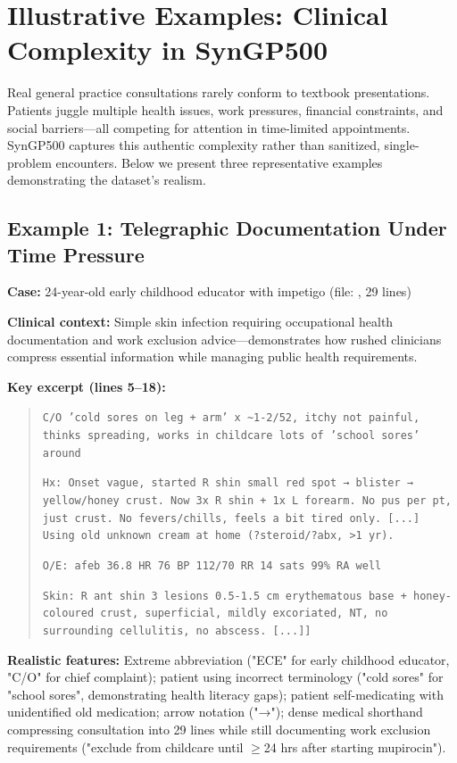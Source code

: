 \documentclass[11pt]{article}
\begin{document}
\section{Illustrative Examples: Clinical Complexity in SynGP500}

Real general practice consultations rarely conform to textbook presentations. Patients juggle multiple health issues, work pressures, financial constraints, and social barriers—all competing for attention in time-limited appointments. SynGP500 captures this authentic complexity rather than sanitized, single-problem encounters. Below we present three representative examples demonstrating the dataset's realism.

\subsection{Example 1: Telegraphic Documentation Under Time Pressure}

\textbf{Case:} 24-year-old early childhood educator with impetigo (file: , 29 lines)

\textbf{Clinical context:} Simple skin infection requiring occupational health documentation and work exclusion advice—demonstrates how rushed clinicians compress essential information while managing public health requirements.

\textbf{Key excerpt (lines 5--18):}
\begin{quote}
\small
\texttt{C/O 'cold sores on leg + arm' x \textasciitilde 1-2/52, itchy not painful, thinks spreading, works in childcare lots of 'school sores' around}

\texttt{Hx: Onset vague, started R shin small red spot → blister → yellow/honey crust. Now 3x R shin + 1x L forearm. No pus per pt, just crust. No fevers/chills, feels a bit tired only. [...] Using old unknown cream at home (?steroid/?abx, >1 yr).}

\texttt{O/E: afeb 36.8 HR 76 BP 112/70 RR 14 sats 99\% RA well}

\texttt{Skin: R ant shin 3 lesions 0.5-1.5 cm erythematous base + honey-coloured crust, superficial, mildly excoriated, NT, no surrounding cellulitis, no abscess. [...]]}
\end{quote}

\textbf{Realistic features:} Extreme abbreviation ("ECE" for early childhood educator, "C/O" for chief complaint); patient using incorrect terminology ("cold sores" for "school sores", demonstrating health literacy gaps); patient self-medicating with unidentified old medication; arrow notation ("→"); dense medical shorthand compressing consultation into 29 lines while still documenting work exclusion requirements ("exclude from childcare until $\geq$24 hrs after starting mupirocin").
\end{document}
